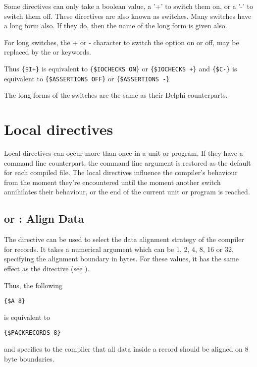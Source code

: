 Some directives can only take a boolean value, a '+' to switch them on,
or a '-' to switch them off. These directives are also known as switches.
Many switches have a long form also. If they do, then the name of the
long form is given also. 

For long switches, the + or - character to switch the option on or off, 
may be replaced by the  or  keywords.

Thus \verb|{$I+}| is equivalent to \verb|{$IOCHECKS ON}| or
\verb|{$IOCHECKS +}| and
\verb|{$C-}| is equivalent to \verb|{$ASSERTIONS OFF}| or
\verb|{$ASSERTIONS -}|

The long forms of the switches are the same as their Delphi
counterparts.



\section{Local directives}
\label{se:LocalSwitch}
Local directives can occur more than once in a unit or program,
If they have a command line counterpart, the command line argument is
restored as the default for each compiled file. The local directives
influence the compiler's behaviour from the moment they're encountered
until the moment another switch annihilates their behaviour, or the end
of the current unit or program is reached.

\subsection{ or  : Align Data}
\label{se:Align}

The  directive can be used to select the data alignment 
strategy of the compiler for records. It takes a numerical argument
which can be 1, 2, 4, 8, 16 or 32, specifying the alignment boundary 
in bytes. For these values, it has the same effect as the 
 directive (see ).

Thus, the following
\begin{verbatim}
{$A 8}
\end{verbatim}
is equivalent to 
\begin{verbatim}
{$PACKRECORDS 8}
\end{verbatim}
and specifies to the compiler that all data inside a record should be aligned on 
8 byte boundaries.


